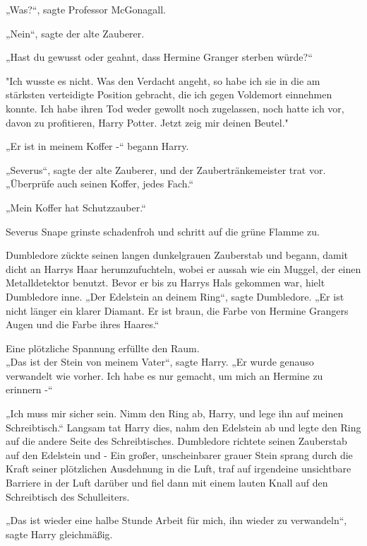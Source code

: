 {„Was?“, sagte Professor McGonagall.

„Nein“, sagte der alte Zauberer.

„Hast du gewusst oder geahnt, dass Hermine Granger sterben würde?“

"Ich wusste es nicht. Was den Verdacht angeht, so habe ich sie in die am stärksten verteidigte Position gebracht, die ich gegen Voldemort einnehmen konnte. Ich habe ihren Tod weder gewollt noch zugelassen, noch hatte ich vor, davon zu profitieren, Harry Potter. Jetzt zeig mir deinen Beutel."

„Er ist in meinem Koffer -“ begann Harry.

„Severus“, sagte der alte Zauberer, und der Zaubertränkemeister trat vor. „Überprüfe auch seinen Koffer, jedes Fach.“

„Mein Koffer hat Schutzzauber.“

Severus Snape grinste schadenfroh und schritt auf die grüne Flamme zu.

Dumbledore zückte seinen langen dunkelgrauen Zauberstab und begann, damit dicht an Harrys Haar herumzufuchteln, wobei er aussah wie ein Muggel, der einen Metalldetektor benutzt. Bevor er bis zu Harrys Hals gekommen war, hielt Dumbledore inne. „Der Edelstein an deinem Ring“, sagte Dumbledore. „Er ist nicht länger ein klarer Diamant. Er ist braun, die Farbe von Hermine Grangers Augen und die Farbe ihres Haares.“

Eine plötzliche Spannung erfüllte den Raum.\\ „Das ist der Stein von meinem Vater“, sagte Harry. „Er wurde genauso verwandelt wie vorher. Ich habe es nur gemacht, um mich an Hermine zu erinnern -“

„Ich muss mir sicher sein. Nimm den Ring ab, Harry, und lege ihn auf meinen Schreibtisch.“ Langsam tat Harry dies, nahm den Edelstein ab und legte den Ring auf die andere Seite des Schreibtisches. Dumbledore richtete seinen Zauberstab auf den Edelstein und - Ein großer, unscheinbarer grauer Stein sprang durch die Kraft seiner plötzlichen Ausdehnung in die Luft, traf auf irgendeine unsichtbare Barriere in der Luft darüber und fiel dann mit einem lauten Knall auf den Schreibtisch des Schulleiters.

„Das ist wieder eine halbe Stunde Arbeit für mich, ihn wieder zu verwandeln“, sagte Harry gleichmäßig.

}
